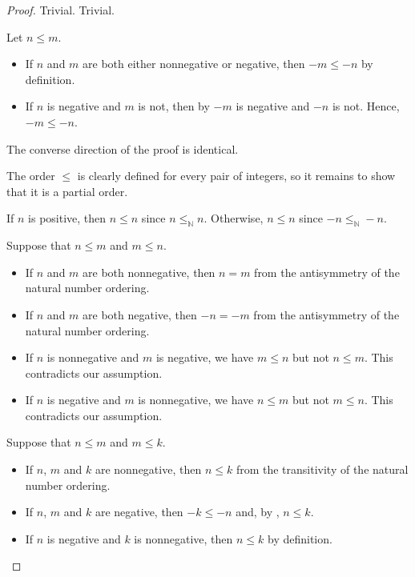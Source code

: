 \begin{proof}
   Trivial.
   Trivial.

   Let \( n \leq m \).
  \begin{itemize}
    \item If \( n \) and \( m \) are both either nonnegative or negative, then \( -m \leq -n \) by definition.
    \item If \( n \) is negative and \( m \) is not, then by  \( -m \) is negative and \( -n \) is not. Hence, \( -m \leq -n \).
  \end{itemize}

  The converse direction of the proof is identical.

   The order \( \leq \) is clearly defined for every pair of integers, so it remains to show that it is a partial order.

   If \( n \) is positive, then \( n \leq n \) since \( n \leq_\BbbN n \). Otherwise, \( n \leq n \) since \( -n \leq_\BbbN -n \).

   Suppose that \( n \leq m \) and \( m \leq n \).
  \begin{itemize}
    \item If \( n \) and \( m \) are both nonnegative, then \( n = m \) from the antisymmetry of the natural number ordering.
    \item If \( n \) and \( m \) are both negative, then \( -n = -m \) from the antisymmetry of the natural number ordering.
    \item If \( n \) is nonnegative and \( m \) is negative, we have \( m \leq n \) but not \( n \leq m \). This contradicts our assumption.
    \item If \( n \) is negative and \( m \) is nonnegative, we have \( n \leq m \) but not \( m \leq n \). This contradicts our assumption.
  \end{itemize}

   Suppose that \( n \leq m \) and \( m \leq k \).
  \begin{itemize}
    \item If \( n \), \( m \) and \( k \) are nonnegative, then \( n \leq k \) from the transitivity of the natural number ordering.
    \item If \( n \), \( m \) and \( k \) are negative, then \( -k \leq -n \) and, by , \( n \leq k \).
    \item If \( n \) is negative and \( k \) is nonnegative, then \( n \leq k \) by definition.
  \end{itemize}


\end{proof}
